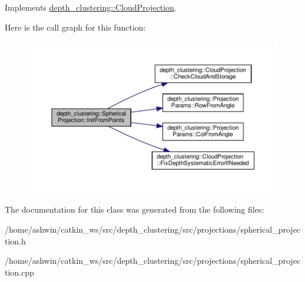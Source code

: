 Implements \hyperlink{classdepth__clustering_1_1CloudProjection_aab5fa3b7362b2c4297bf9b445ccc7ff8}{depth\+\_\+clustering\+::\+Cloud\+Projection}.

Here is the call graph for this function\+:\nopagebreak
\begin{figure}[H]
\begin{center}
\leavevmode
\includegraphics[width=350pt]{classdepth__clustering_1_1SphericalProjection_ab80cb1d72f60e7a887affa0ab10ebc03_cgraph}
\end{center}
\end{figure}


The documentation for this class was generated from the following files\+:\begin{DoxyCompactItemize}
\item 
/home/ashwin/catkin\+\_\+ws/src/depth\+\_\+clustering/src/projections/spherical\+\_\+projection.\+h\item 
/home/ashwin/catkin\+\_\+ws/src/depth\+\_\+clustering/src/projections/spherical\+\_\+projection.\+cpp\end{DoxyCompactItemize}

